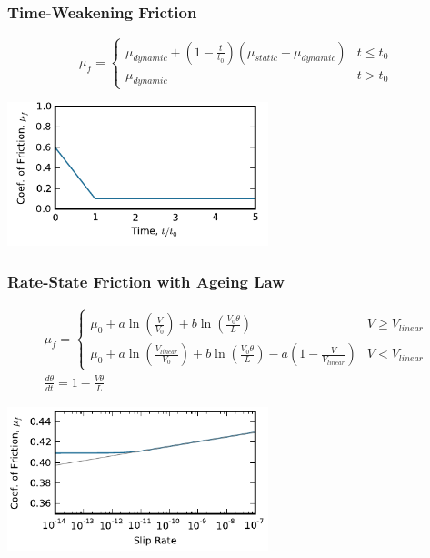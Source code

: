 \documentclass[aspectratio=169]{beamer}
\begin{document}
\begin{frame}
  \frametitle{Time-Weakening Friction}
  
  \begin{equation}
    \mu_f = \left\{ \begin{array}{ll}
        \mu_\mathit{dynamic} + (1 - \frac{t}{t_0})
        (\mu_\mathit{static} -\mu_\mathit{dynamic}) & t \leq t_0 \\
        \mu_\mathit{dynamic} & t > t_0
      \end{array} \right.
  \end{equation}
  \begin{center}
    \includegraphics[height=1.65in]{figs/friction_timeweak}
  \end{center}
  
\end{frame}


\begin{frame}
  \frametitle{Rate-State Friction with Ageing Law}
  
  \begin{gather}
    \mu_f = \left\{ \begin{array}{ll}
        \mu_0 + a \ln (\frac{V}{V_0}) + b \ln (\frac{V_0 \theta}{L}) & V \ge V_\mathit{linear} \\
        \mu_0 + a \ln (\frac{V_\mathit{linear}}{V_0}) + b \ln
        (\frac{V_0\theta}{L}) - a (1 - \frac{V}{V_\mathit{linear}}) & V
        < V_\mathit{linear}
      \end{array} \right. \\
    \frac{d \theta}{dt} = 1 - \frac{V \theta}{L}
  \end{gather}
  \begin{center}
    \includegraphics[height=1.65in]{figs/friction_ratestate}
  \end{center}
  
\end{frame}
\end{document}
